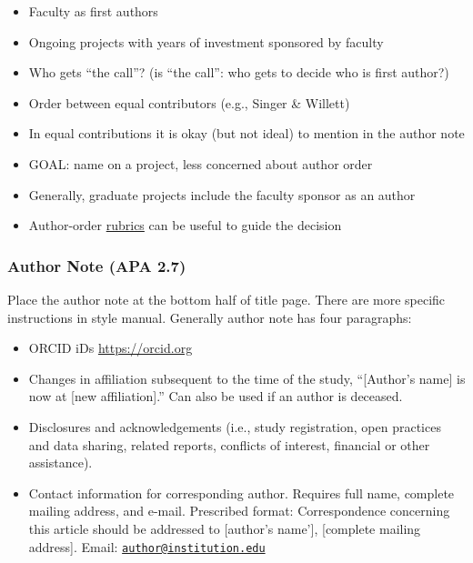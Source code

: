 \documentclass[
  11pt,
]{book}
\providecommand{\tightlist}{%
  \setlength{\itemsep}{0pt}\setlength{\parskip}{0pt}}
\begin{document}
\begin{itemize}
\tightlist
\item
  Faculty as first authors
\item
  Ongoing projects with years of investment sponsored by faculty
\item
  Who gets ``the call''? (is ``the call'': who gets to decide who is first author?)
\item
  Order between equal contributors (e.g., Singer \& Willett)
\item
  In equal contributions it is okay (but not ideal) to mention in the author note
\item
  GOAL: name on a project, less concerned about author order
\item
  Generally, graduate projects include the faculty sponsor as an author
\item
  Author-order \href{https://github.com/lhbikos/TransformingResearchMethods/blob/main/Authorship\%20Rubric220721.xlsx}{rubrics} can be useful to guide the decision
\end{itemize}

\hypertarget{author-note-apa-2.7}{%
\subsubsection{Author Note (APA 2.7)}\label{author-note-apa-2.7}}

Place the author note at the bottom half of title page. There are more specific instructions in style manual. Generally author note has four paragraphs:

\begin{itemize}
\tightlist
\item
  ORCID iDs \url{https://orcid.org}
\item
  Changes in affiliation subsequent to the time of the study, ``{[}Author's name{]} is now at {[}new affiliation{]}.'' Can also be used if an author is deceased.
\item
  Disclosures and acknowledgements (i.e., study registration, open practices and data sharing, related reports, conflicts of interest, financial or other assistance).
\item
  Contact information for corresponding author. Requires full name, complete mailing address, and e-mail. Prescribed format: Correspondence concerning this article should be addressed to {[}author's name'{]}, {[}complete mailing address{]}. Email: \href{mailto:author@institution.edu}{\nolinkurl{author@institution.edu}}
\end{itemize}
\end{document}
